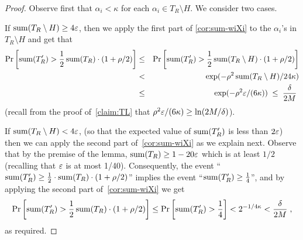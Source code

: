 \begin{proof}
Observe first that $\alpha_i < \kappa$ for each $\alpha_i \in T_R \setminus H$.
We consider two cases.

If $\operatorname{sum}(T_R \setminus H) \geq 4 \varepsilon$, then we apply the first part of
\cref{cor:sum-wiXi} to the $\alpha_i$'s in $T_R \setminus H$
and get that
\begin{eqnarray}
\Pr\left[\operatorname{sum}(T'_R) > {\frac{1}2} \operatorname{sum}(T_R) \cdot (1 + \rho/2)\right]
 &\leq& \Pr\left[\operatorname{sum}(T'_R) > {\frac{1}2} \operatorname{sum}(T_R \setminus H)
    \cdot (1 + \rho/2)\right] \nonumber \\
    &<& \exp(-\rho^2 \operatorname{sum}(T_R \setminus H)/24\kappa)\\
    &\leq& \exp(-\rho^2 \varepsilon/(6 \kappa)) \;\leq\; \frac{\delta}{2M}\;
\end{eqnarray}
(recall from the proof of~\cref{claim:TL} that $\rho^2 \varepsilon / (6 \kappa) \geq \ln(2M/\delta)$).

If $\operatorname{sum}(T_R \setminus H) < 4 \varepsilon$,
(so that the expected value of $\operatorname{sum}(T'_R)$ is less than
{$2\varepsilon$}) then we can apply the second part
of~\cref{cor:sum-wiXi} as we explain next.
Observe that by the premise of the lemma,
$\operatorname{sum}(T_R) \geq 1 - 20 \varepsilon$ which is at least
$1/2$ (recalling that $\varepsilon$ is at most 1/40). Consequently, the event ``$\operatorname{sum}(T'_R) \geq {\frac{1}2} \cdot \operatorname{sum}(T_R)\cdot
(1 + \rho/2)$'' implies the event
``$\operatorname{sum}(T'_R) \geq {\frac{1}4}$'', and by applying the second part
of~\cref{cor:sum-wiXi} we get
\begin{equation}
\Pr\left[\operatorname{sum}(T'_R) > {\frac{1}2} \operatorname{sum}(T_R) \cdot (1 + \rho/2)\right]
 \leq \Pr\left[\operatorname{sum}(T'_R) > \frac{1}{4}\right] < 2^{-1/4\kappa}
   < \frac{\delta}{2M}\;,
\end{equation}
as required.
\end{proof}


